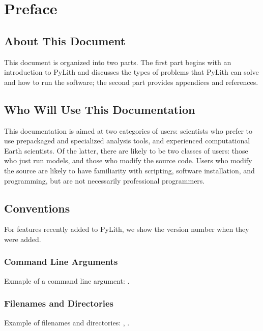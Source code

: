 
\chapter{Preface}


\section{About This Document}

This document is organized into two parts. The first part begins with
an introduction to PyLith and discusses the types of problems that
PyLith can solve and how to run the software; the second part provides
appendices and references.


\section{Who Will Use This Documentation}

This documentation is aimed at two categories of users: scientists
who prefer to use prepackaged and specialized analysis tools, and
experienced computational Earth scientists. Of the latter, there are
likely to be two classes of users: those who just run models, and
those who modify the source code. Users who modify the source are
likely to have familiarity with scripting, software installation,
and programming, but are not necessarily professional programmers.

\section{Conventions}


For features recently added to PyLith, we show the version number when
they were added.

\subsection{Command Line Arguments}

Exmaple of a command line argument: .

\subsection{Filenames and Directories}

Example of filenames and directories: , .

